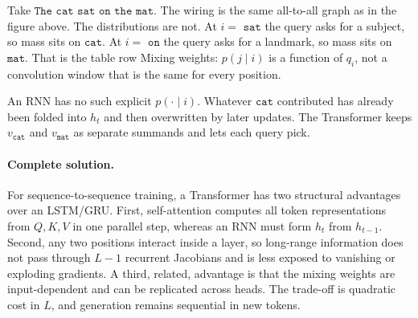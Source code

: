 \documentclass[11pt,a4paper]{article}
\theoremstyle{definition}
\begin{document}
\begin{example}
\label{ex:spr2025-nlp-two-queries}
Take \(\texttt{The cat sat on the mat}\). The wiring is the same all-to-all graph as in the figure above. The distributions are not. At \(i=\) \(\texttt{sat}\) the query asks for a subject, so mass sits on \(\texttt{cat}\). At \(i=\) \(\texttt{on}\) the query asks for a landmark, so mass sits on \(\texttt{mat}\). That is the table row Mixing weights: \(p(j\mid i)\) is a function of \(q_i\), not a convolution window that is the same for every position.

\begin{center}
\end{center}

An RNN has no such explicit \(p(\cdot\mid i)\). Whatever \(\texttt{cat}\) contributed has already been folded into \(h_t\) and then overwritten by later updates. The Transformer keeps \(v_{\texttt{cat}}\) and \(v_{\texttt{mat}}\) as separate summands and lets each query pick.
\end{example}

\paragraph{Complete solution.}
For sequence-to-sequence training, a Transformer has two structural advantages over an LSTM/GRU. First, self-attention computes all token representations from \(Q,K,V\) in one parallel step, whereas an RNN must form \(h_t\) from \(h_{t-1}\). Second, any two positions interact inside a layer, so long-range information does not pass through \(L-1\) recurrent Jacobians and is less exposed to vanishing or exploding gradients. A third, related, advantage is that the mixing weights are input-dependent and can be replicated across heads. The trade-off is quadratic cost in \(L\), and generation remains sequential in new tokens.
\end{document}
